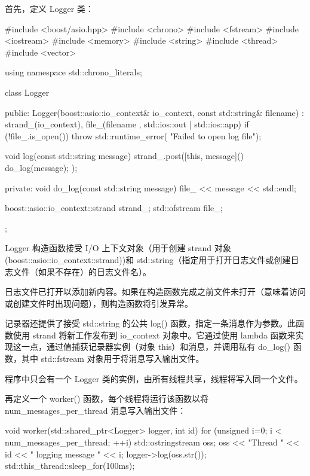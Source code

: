 首先，定义 Logger 类：

\begin{cpp}
#include <boost/asio.hpp>
#include <chrono>
#include <fstream>
#include <iostream>
#include <memory>
#include <string>
#include <thread>
#include <vector>

using namespace std::chrono_literals;

class Logger {
    public:
    Logger(boost::asio::io_context& io_context,
            const std::string& filename)
        : strand_(io_context), file_(filename
        , std::ios::out | std::ios::app)
    {
        if (!file_.is_open()) {
            throw std::runtime_error(
            "Failed to open log file");
        }
    }

    void log(const std::string message) {
        strand_.post([this, message](){
            do_log(message);
        });
    }

private:
    void do_log(const std::string message) {
        file_ << message << std::endl;
    }

    boost::asio::io_context::strand strand_;
    std::ofstream file_;
};
\end{cpp}

Logger 构造函数接受 I/O 上下文对象（用于创建 strand 对象 (boost::asio::io\_context::strand))和 std::string（指定用于打开日志文件或创建日志文件（如果不存在）的日志文件名）。

日志文件已打开以添加新内容。如果在构造函数完成之前文件未打开（意味着访问或创建文件时出现问题），则构造函数将引发异常。

记录器还提供了接受 std::string 的公共 log() 函数，指定一条消息作为参数。此函数使用 strand 将新工作发布到 io\_context 对象中。它通过使用 lambda 函数来实现这一点，通过值捕获记录器实例（对象 this）和消息，并调用私有 do\_log() 函数，其中 std::fstream 对象用于将消息写入输出文件。

程序中只会有一个 Logger 类的实例，由所有线程共享，线程将写入同一个文件。

再定义一个 worker() 函数，每个线程将运行该函数以将 num\_messages\_per\_thread 消息写入输出文件：

\begin{cpp}
void worker(std::shared_ptr<Logger> logger, int id) {
    for (unsigned i=0; i < num_messages_per_thread; ++i) {
        std::ostringstream oss;
        oss << "Thread " << id << " logging message " << i;
        logger->log(oss.str());
        std::this_thread::sleep_for(100ms);
    }
}
\end{cpp}

